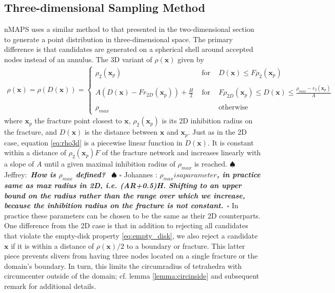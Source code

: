 \documentclass[preprint, 10pt]{elsarticle}
\newcommand{\vx}{{\mathbf x}}
\newif\ifnotesw \noteswtrue
\newcommand{\jeffrey}[1]{\ifnotesw  \textcolor[rgb]{0,0,1}{  $\spadesuit$Jeffrey:\ {\sf \bf \it #1}\ $\spadesuit$ }\fi}
\newcommand{\johannes}[1]{\ifnotesw  \textcolor[rgb]{1,0,1}{ $\square$ Johannes : {\sf \bf \it #1}\ $\square$ }\fi}
\theoremstyle{definition}
\theoremstyle{remark}
\begin{document}
\subsection{Three-dimensional Sampling Method}
nMAPS uses a similar method to that presented in the two-dimensional section to generate a point distribution in three-dimensional space. 
The primary difference is that candidates are generated on a spherical shell around accepted nodes instead of an annulus. 
The 3D variant of $\rho(\vx)$  given by
\begin{align}
\rho(\vx) = \rho(D(\vx))=\left
\{\begin{matrix}
\rho_{2}(\vx_p)  &\text{ for }&  D(\vx)\le F\rho_2(\vx_p)\\\\
A(D(\vx)-Fr_{2D}(\vx_p))+\frac{H}{2} & \text{ for }& F\rho_{2D}(\vx_p)\le D(\vx) \le \frac{\rho_{max}-r_{2}(\vx_p)}{A} \\\\
 \rho_{max}& & \text{otherwise} 
\end{matrix}
\right. \label{eq:rho3d}
\end{align}
where $\vx_p$ the fracture point closest to $\vx$, $\rho_2(\vx_p)$ is its 2D inhibition radius on the fracture, and $D(\vx)$ is the distance between $\vx$ and $\vx_p$.
Just as in the 2D case, equation \eqref{eq:rho3d} is a piecewise linear function in $D(\vx)$. 
It is constant within a distance of $\rho_2(\vx_p)F$ of the fracture network and increases linearly with a slope of $A$ until a given maximal inhibition radius of $\rho_{max}$ is reached. 
\jeffrey{How is $\rho_{max}$ defined? }\johannes{$\rho_{max} is a parameter$, in practice same as max radius in 2D, i.e. (AR+0.5)H. Shifting to an upper bound on the radius rather than the range over which we increase, because the inhibition radius on the fracture is not constant.} In practice these parameters can be chosen to be the same as their 2D counterparts.
One difference from the 2D case is that in addition to rejecting all candidates that violate the empty-disk property \eqref{eq:empty_disk}, we also reject a candidate $\vx$ if it is within a distance of $\rho(\vx)/2$ to a boundary or fracture. 
This latter piece prevents slivers from having three nodes located on a single fracture or the domain's boundary.
In turn, this limits the circumradius of tetrahedra with circumcenter outside of the domain; cf. lemma \ref{lemma:circinside} and subsequent remark for additional details.
\end{document}
